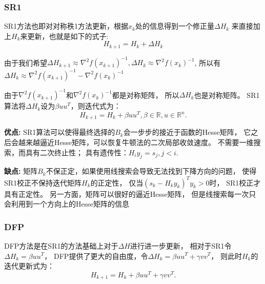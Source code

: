             \subsubsection{SR1}
                SR1方法\cite{1980Curvilinear}也即对对称秩1方法更新，根据$x_k$处的信息得到一个修正量$\Delta H_k$
                来直接加上$H_k$来更新，也就是如下的式子:
                \begin{equation}
                    H_{k+1} = H_k + \Delta H_k
                \end{equation}
                
                由于我们希望$\Delta H_{k+1} \approx \nabla^2f(x_{k+1})^{-1},
                             \Delta H_{k} \approx \nabla^2f(x_k)^{-1}$,
                所以有$\Delta H_k \approx \nabla^2f(x_{k+1})^{-1}-\nabla^2f(x_k)^{-1}$
                
                由于$\nabla^2f(x_{k+1})^{-1}$和$\nabla^2f(x_k)^{-1}$都是对称矩阵，
                所以$\Delta H_k$也是对称矩阵。
                SR1算法将$\Delta H_k$设为$\beta uu^T$，则迭代式为：
                \begin{equation}
                    H_{k+1} = H_{k} + \beta uu^T, \beta\in \mathbb{R}, u \in \mathbb{R}^{n}.
                \end{equation}
                
                \textbf{优点:}
                    SR1算法可以使得最终选择的$B_k$会一步步的接近于函数的Hesse矩阵，
                    它之后会越来越逼近Hesse矩阵，可以恢复牛顿法的二次局部收敛速度。
                    不需要一维搜索，而具有二次终止性；
                    具有遗传性：$H_iy_j=s_j,j<i.$
                
                \textbf{缺点:}
                    矩阵$B_k$不保正定，如果使用线搜索会导致无法找到下降方向的问题，
                    使得SR1校正不保持迭代矩阵$H_k$的正定性，
                    仅当$(s_k-H_ky_k)^Ty_k>0$时，
                    SR1校正才具有正定性。
                    另一方面，矩阵可以很好的逼近Hesse矩阵，
                    但是线搜索每一次只会利用到一个方向上的Hesse矩阵的信息
                    
            \subsubsection{DFP}
                DFP方法\cite{1963A}是在SR1的方法基础上对于$\Delta H$进行进一步更新，
                相对于SR1令$\Delta H_k = \beta uu^T$，
                DFP提供了更大的自由度，令$\Delta H_k = \beta uu^T + \gamma vv^T$，
                则此时$H_k$的迭代更新式为：
                \begin{equation}
                    H_{k+1} = H_{k} + \beta uu^T + \gamma vv^T.
                \end{equation}
                
